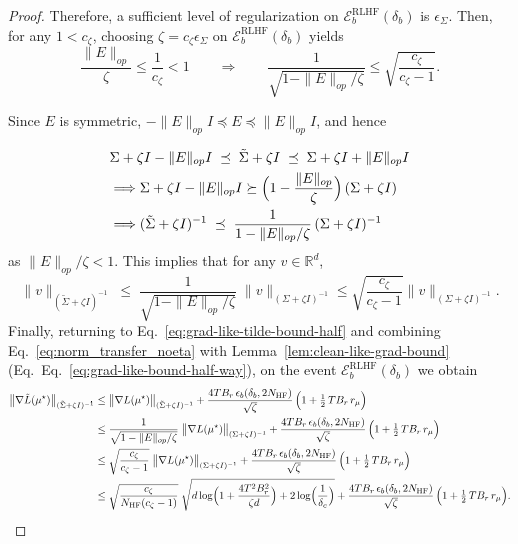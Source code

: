 \documentclass[10pt]{article} %
\theoremstyle{plain}
\theoremstyle{definition}
\theoremstyle{remark}
\newcommand{\bR}{\mathbb{R}}
\begin{document}
\begin{proof}
Therefore, a sufficient level of regularization on $\mathcal{E}_{b}^{\mathrm{RLHF}}(\delta_b)$ is $\epsilon_\Sigma$. Then, for any $1<c_{\zeta}$, choosing $\zeta=c_{\zeta}\epsilon_\Sigma$ on $\mathcal{E}_{b}^{\mathrm{RLHF}}(\delta_b)$ yields
\begin{equation}\label{eq:cov-pert-upper}
\frac{\|E\|_{op}}{\zeta}\le\frac1{c_{\zeta}}<1
\qquad\Longrightarrow\qquad \frac{1}{\sqrt{1-\|E\|_{op}/\zeta}}
\le \sqrt{\frac{c_{\zeta}}{c_{\zeta}-1}} .
\end{equation}

Since $E$ is symmetric, $-\|E\|_{op}I\preceq E\preceq \|E\|_{op}I$, and hence

\begin{align} \label{eq:inverse_comparison_repl_noeta}
&\Sigma+\zeta I-\|E\|_{op}I \;\preceq\; \tilde\Sigma+\zeta I \;\preceq\; \Sigma+\zeta I+\|E\|_{op}I\notag\\
&\Longrightarrow \Sigma+\zeta I-\|E\|_{op}I
\succeq
\Bigl(1-\frac{\|E\|_{op}}{\zeta}\Bigr)\,(\Sigma+\zeta I)\notag\\
&\Longrightarrow (\tilde\Sigma+\zeta I)^{-1}
\;\preceq\;
\frac{1}{1-\|E\|_{op}/\zeta}\,(\Sigma+\zeta I)^{-1}
\end{align}
as $\|E\|_{op}/\zeta<1$. This implies that for any $v\in\bR^d$,
\begin{equation}\label{eq:norm_transfer_noeta}
\|v\|_{(\tilde\Sigma+\zeta I)^{-1}}
\;\le\;
\frac{1}{\sqrt{1-\|E\|_{op}/\zeta}}\;
\|v\|_{(\Sigma+\zeta I)^{-1}}\le \sqrt{\frac{c_\zeta}{c_\zeta-1}}\|v\|_{(\Sigma+\zeta I)^{-1}}.
\end{equation}
\noindent Finally, returning to Eq.~\ref{eq:grad-like-tilde-bound-half} and combining
Eq.~\ref{eq:norm_transfer_noeta} with Lemma~\ref{lem:clean-like-grad-bound} (Eq.~Eq.~\ref{eq:grad-like-bound-half-way}), on the event
$\mathcal E_{b}^{\mathrm{RLHF}}(\delta_b)$ we obtain
\begin{align*}
\bigl\|\nabla\tilde L(\mu^\star) \bigr\|_{(\tilde\Sigma+\zeta I)^{-1}}
&\le \bigl\|\nabla L(\mu^\star)\bigr\|_{(\tilde\Sigma+\zeta I)^{-1}}
+ \frac{4T B_r\,\epsilon_b(\delta_b, 2N_{\mathrm{HF}})}{\sqrt{\zeta }}\,
\Bigl(1+\tfrac12\,T B_r\,r_\mu\Bigr)\\
&\le \frac{1}{\sqrt{1-\|E\|_{op}/\zeta}}\;
\bigl\|\nabla L(\mu^\star)\bigr\|_{(\Sigma+\zeta I)^{-1}}
+ \frac{4T B_r\,\epsilon_b(\delta_b, 2N_{\mathrm{HF}})}{\sqrt{\zeta }}\,
\Bigl(1+\tfrac12\,T B_r\,r_\mu\Bigr)\\
&\le \sqrt{\frac{c_{\zeta}}{c_{\zeta}-1}}\;
\bigl\|\nabla L(\mu^\star)\bigr\|_{(\Sigma+\zeta I)^{-1}}
+ \frac{4T B_r\,\epsilon_b(\delta_b, 2N_{\mathrm{HF}})}{\sqrt{\zeta }}\,
\Bigl(1+\tfrac12\,T B_r\,r_\mu\Bigr)\\
&\le \sqrt{\frac{c_{\zeta}}{N_{\mathrm{HF}}(c_{\zeta}-1)}}\;
\sqrt{d\log \Bigl(1+\frac{4T^2 B_r^2}{\zeta d}\Bigr)+2\log \Bigl(\frac{1}{\delta_c}\Bigr)}
+ \frac{4T B_r\,\epsilon_b(\delta_b, 2N_{\mathrm{HF}})}{\sqrt{\zeta }}\,
\Bigl(1+\tfrac12\,T B_r\,r_\mu\Bigr).
\end{align*}



\end{proof}
\end{document}
